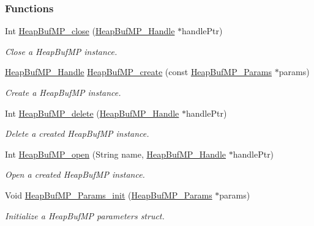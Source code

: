 \subsubsection*{Functions}
\begin{DoxyCompactItemize}
\item 
Int \hyperlink{_heap_buf_m_p_8h_a53c73d33bd195e23cd90c83a147b330f}{Heap\-Buf\-M\-P\-\_\-close} (\hyperlink{_heap_buf_m_p_8h_a0dc02cca2abd71fa48bfaf79c1c09ca3}{Heap\-Buf\-M\-P\-\_\-\-Handle} $\ast$handle\-Ptr)
\begin{DoxyCompactList}\small\item\em Close a Heap\-Buf\-M\-P instance. \end{DoxyCompactList}\item 
\hyperlink{_heap_buf_m_p_8h_a0dc02cca2abd71fa48bfaf79c1c09ca3}{Heap\-Buf\-M\-P\-\_\-\-Handle} \hyperlink{_heap_buf_m_p_8h_a3bb1b659403d9944bc4b64596b20f1f3}{Heap\-Buf\-M\-P\-\_\-create} (const \hyperlink{struct_heap_buf_m_p___params}{Heap\-Buf\-M\-P\-\_\-\-Params} $\ast$params)
\begin{DoxyCompactList}\small\item\em Create a Heap\-Buf\-M\-P instance. \end{DoxyCompactList}\item 
Int \hyperlink{_heap_buf_m_p_8h_aff10f0e0fc4ec4b88adb2b7422955f96}{Heap\-Buf\-M\-P\-\_\-delete} (\hyperlink{_heap_buf_m_p_8h_a0dc02cca2abd71fa48bfaf79c1c09ca3}{Heap\-Buf\-M\-P\-\_\-\-Handle} $\ast$handle\-Ptr)
\begin{DoxyCompactList}\small\item\em Delete a created Heap\-Buf\-M\-P instance. \end{DoxyCompactList}\item 
Int \hyperlink{_heap_buf_m_p_8h_a826facae0861c09d545f18dd503f0f0f}{Heap\-Buf\-M\-P\-\_\-open} (String name, \hyperlink{_heap_buf_m_p_8h_a0dc02cca2abd71fa48bfaf79c1c09ca3}{Heap\-Buf\-M\-P\-\_\-\-Handle} $\ast$handle\-Ptr)
\begin{DoxyCompactList}\small\item\em Open a created Heap\-Buf\-M\-P instance. \end{DoxyCompactList}\item 
Void \hyperlink{_heap_buf_m_p_8h_a81700157982b86ed3aefc72c6f3a7a5f}{Heap\-Buf\-M\-P\-\_\-\-Params\-\_\-init} (\hyperlink{struct_heap_buf_m_p___params}{Heap\-Buf\-M\-P\-\_\-\-Params} $\ast$params)
\begin{DoxyCompactList}\small\item\em Initialize a Heap\-Buf\-M\-P parameters struct. \end{DoxyCompactList}\item 

\end{DoxyCompactItemize}
